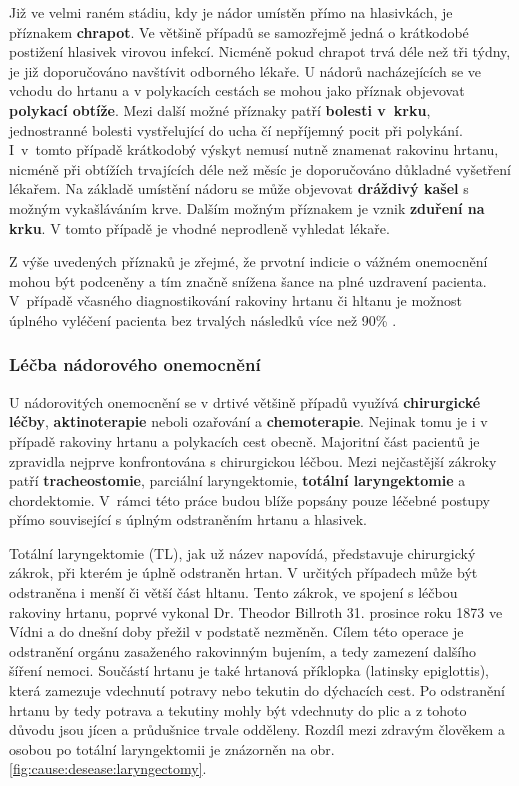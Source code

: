 Již ve velmi raném stádiu, kdy je nádor umístěn přímo na hlasivkách, je
příznakem \textbf{chrapot}. Ve většině případů se samozřejmě jedná o
krátkodobé postižení hlasivek virovou infekcí. Nicméně pokud chrapot trvá déle
než tři týdny, je již doporučováno navštívit odborného lékaře.
U nádorů nacházejících se ve vchodu do hrtanu a v polykacích cestách se mohou
jako příznak objevovat \textbf{polykací obtíže}. Mezi další možné příznaky
patří \textbf{bolesti v~krku}, jednostranné bolesti vystřelující do ucha čí
nepříjemný pocit při polykání. I~v~tomto případě krátkodobý výskyt nemusí
nutně znamenat rakovinu hrtanu, nicméně při obtížích trvajících déle než měsíc
je doporučováno důkladné  vyšetření lékařem.
Na základě umístění nádoru se může objevovat \textbf{dráždivý kašel} s možným
vykašláváním krve. Dalším možným příznakem je vznik \textbf{zduření na krku}.
V tomto případě je vhodné neprodleně vyhledat lékaře.

Z výše uvedených příznaků je zřejmé, že prvotní indicie o vážném onemocnění
mohou být podceněny a tím značně snížena šance na plné uzdravení pacienta.
V~případě včasného diagnostikování rakoviny hrtanu či hltanu je možnost
úplného vyléčení pacienta bez trvalých následků více než 90\%
\cite{Slavicek2000}.


\subsubsection{Léčba nádorového onemocnění} %
\label{ssub:cause:desease:cancer:treatment}

U nádorovitých onemocnění se v drtivé většině případů využívá
\textbf{chirurgické léčby}, \textbf{aktinoterapie} neboli ozařování a
\textbf{chemoterapie}. Nejinak tomu je i v případě rakoviny hrtanu a
polykacích cest obecně. Majoritní část pacientů je zpravidla nejprve
konfrontována s chirurgickou léčbou. Mezi nejčastější zákroky patří
\textbf{tracheostomie}, parciální laryngektomie, \textbf{totální
laryngektomie} a chordektomie. V~rámci této práce budou blíže popsány pouze
léčebné postupy přímo související s úplným odstraněním hrtanu a hlasivek.

Totální laryngektomie (TL), jak už název napovídá, představuje chirurgický
zákrok, při kterém je úplně odstraněn hrtan. V určitých případech může být
odstraněna i menší či větší část hltanu. Tento zákrok, ve spojení s léčbou
rakoviny hrtanu, poprvé vykonal Dr. Theodor Billroth 31. prosince roku 1873 ve
Vídni \cite{Gussenbauer1874} a do dnešní doby přežil v podstatě nezměněn.
Cílem této operace je odstranění orgánu zasaženého rakovinným bujením, a tedy
zamezení dalšího šíření nemoci. Součástí hrtanu je také hrtanová příklopka
(latinsky epiglottis), která zamezuje vdechnutí potravy nebo tekutin do
dýchacích cest. Po odstranění hrtanu by tedy potrava a tekutiny mohly být
vdechnuty do plic a z tohoto důvodu jsou jícen a průdušnice trvale odděleny.
Rozdíl mezi zdravým člověkem a osobou po totální laryngektomii je znázorněn na
obr. \ref{fig:cause:desease:laryngectomy}.

